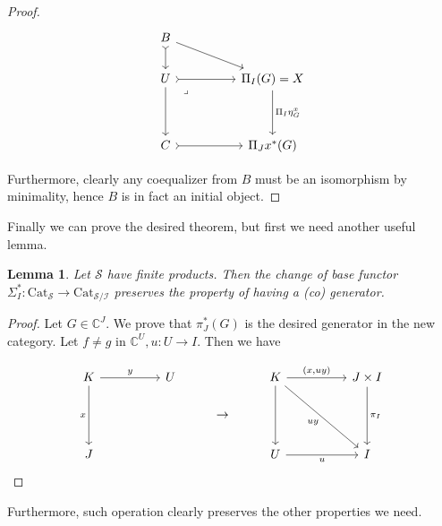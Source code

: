 \documentclass[10pt, oneside]{article}
\newtheorem{lemma}[theorem]{Lemma}
\begin{document}
\begin{proof}
    \[\begin{tikzcd}[ampersand replacement=\&]
	B \\
	U \&\& {\Pi_I(G) = X} \\
	\\
	C \&\& {\Pi_J x^\ast(G)}
	\arrow["{\Pi_I \eta^x_G}", from=2-3, to=4-3]
	\arrow[tail, from=4-1, to=4-3]
	\arrow[from=2-1, to=4-1]
	\arrow[tail, from=2-1, to=2-3]
	\arrow[tail, from=1-1, to=2-1]
	\arrow[from=1-1, to=2-3]
	\arrow["\lrcorner"{anchor=center, pos=0.125}, draw=none, from=2-1, to=4-3]
\end{tikzcd}\]

    Furthermore, clearly any coequalizer from $B$ must be an isomorphism by minimality, hence $B$ is in fact an initial object.
\end{proof}

Finally we can prove the desired theorem, but first we need another useful lemma.

\begin{lemma}
    Let $\mathcal{S}$ have finite products. Then the change of base functor $\Sigma_I^\ast: \mathrm{Cat}_\mathcal{S} \to \mathrm{Cat}_\mathcal{S /I}$ preserves the property of having a (co) generator.
\end{lemma}
\begin{proof}
    Let $G \in \mathbb{C}^J$. We prove that $\pi_J^\ast (G)$ is the desired generator in the new category. Let $f \neq g$ in $\mathbb{C}^U, u: U \to I$. Then we have

    \[\begin{tikzcd}[ampersand replacement=\&]
	K \&\& U \&\& K \&\& {J \times I} \\
	\&\&\& \rightarrow \\
	J \&\&\&\& U \&\& I
	\arrow["{\pi_I}", from=1-7, to=3-7]
	\arrow["u"', from=3-5, to=3-7]
	\arrow["x"', from=1-1, to=3-1]
	\arrow["y", from=1-1, to=1-3]
	\arrow["{(x, uy)}", from=1-5, to=1-7]
	\arrow[from=1-5, to=3-5]
	\arrow["uy"', from=1-5, to=3-7]
\end{tikzcd}\]
\end{proof}

Furthermore, such operation clearly preserves the other properties we need.
\end{document}
